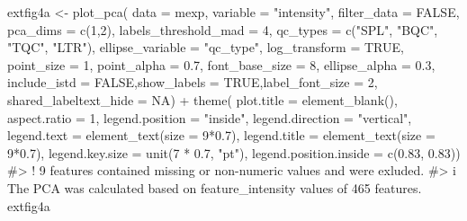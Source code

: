 \documentclass[
  letterpaper,
  DIV=11,
  numbers=noendperiod]{scrartcl}
\newenvironment{Shaded}{\begin{snugshade}}{\end{snugshade}}
\newcommand{\AttributeTok}[1]{\textcolor[rgb]{0.40,0.45,0.13}{#1}}
\newcommand{\CommentTok}[1]{\textcolor[rgb]{0.37,0.37,0.37}{#1}}
\newcommand{\ConstantTok}[1]{\textcolor[rgb]{0.56,0.35,0.01}{#1}}
\newcommand{\DecValTok}[1]{\textcolor[rgb]{0.68,0.00,0.00}{#1}}
\newcommand{\FloatTok}[1]{\textcolor[rgb]{0.68,0.00,0.00}{#1}}
\newcommand{\FunctionTok}[1]{\textcolor[rgb]{0.28,0.35,0.67}{#1}}
\newcommand{\NormalTok}[1]{\textcolor[rgb]{0.00,0.23,0.31}{#1}}
\newcommand{\OtherTok}[1]{\textcolor[rgb]{0.00,0.23,0.31}{#1}}
\newcommand{\SpecialCharTok}[1]{\textcolor[rgb]{0.37,0.37,0.37}{#1}}
\newcommand{\StringTok}[1]{\textcolor[rgb]{0.13,0.47,0.30}{#1}}
\begin{document}
\begin{Shaded}
\begin{Highlighting}[]
\NormalTok{extfig4a }\OtherTok{\textless{}{-}} \FunctionTok{plot\_pca}\NormalTok{(}
  \AttributeTok{data =}\NormalTok{ mexp,}
  \AttributeTok{variable =} \StringTok{"intensity"}\NormalTok{,}
  \AttributeTok{filter\_data =} \ConstantTok{FALSE}\NormalTok{,}
  \AttributeTok{pca\_dims =} \FunctionTok{c}\NormalTok{(}\DecValTok{1}\NormalTok{,}\DecValTok{2}\NormalTok{),}
  \AttributeTok{labels\_threshold\_mad =} \DecValTok{4}\NormalTok{,}
  \AttributeTok{qc\_types =} \FunctionTok{c}\NormalTok{(}\StringTok{"SPL"}\NormalTok{, }\StringTok{"BQC"}\NormalTok{, }\StringTok{"TQC"}\NormalTok{, }\StringTok{"LTR"}\NormalTok{),}
  \AttributeTok{ellipse\_variable =} \StringTok{"qc\_type"}\NormalTok{,}
  \AttributeTok{log\_transform =} \ConstantTok{TRUE}\NormalTok{,}
  \AttributeTok{point\_size =} \DecValTok{1}\NormalTok{, }\AttributeTok{point\_alpha =} \FloatTok{0.7}\NormalTok{, }\AttributeTok{font\_base\_size =} \DecValTok{8}\NormalTok{, }\AttributeTok{ellipse\_alpha =} \FloatTok{0.3}\NormalTok{,}
  \AttributeTok{include\_istd =} \ConstantTok{FALSE}\NormalTok{,}\AttributeTok{show\_labels =} \ConstantTok{TRUE}\NormalTok{,}\AttributeTok{label\_font\_size =} \DecValTok{2}\NormalTok{,}
  \AttributeTok{shared\_labeltext\_hide =} \ConstantTok{NA}\NormalTok{)   }\SpecialCharTok{+} \FunctionTok{theme}\NormalTok{(}
    \AttributeTok{plot.title =} \FunctionTok{element\_blank}\NormalTok{(),}
    \AttributeTok{aspect.ratio =} \DecValTok{1}\NormalTok{,}
        \AttributeTok{legend.position =} \StringTok{"inside"}\NormalTok{,}
      \AttributeTok{legend.direction =} \StringTok{"vertical"}\NormalTok{, }
      \AttributeTok{legend.text =} \FunctionTok{element\_text}\NormalTok{(}\AttributeTok{size =} \DecValTok{9}\SpecialCharTok{*}\FloatTok{0.7}\NormalTok{), }
      \AttributeTok{legend.title =} \FunctionTok{element\_text}\NormalTok{(}\AttributeTok{size =} \DecValTok{9}\SpecialCharTok{*}\FloatTok{0.7}\NormalTok{),}
      \AttributeTok{legend.key.size =} \FunctionTok{unit}\NormalTok{(}\DecValTok{7} \SpecialCharTok{*} \FloatTok{0.7}\NormalTok{, }\StringTok{"pt"}\NormalTok{), }
      \AttributeTok{legend.position.inside =} \FunctionTok{c}\NormalTok{(}\FloatTok{0.83}\NormalTok{, }\FloatTok{0.83}\NormalTok{)) }
\CommentTok{\#\textgreater{} ! 9 features contained missing or non{-}numeric values and were exluded.}
\CommentTok{\#\textgreater{} i The PCA was calculated based on \textasciigrave{}feature\_intensity\textasciigrave{} values of 465 features.}
\NormalTok{extfig4a}
\end{Highlighting}
\end{Shaded}
\end{document}
